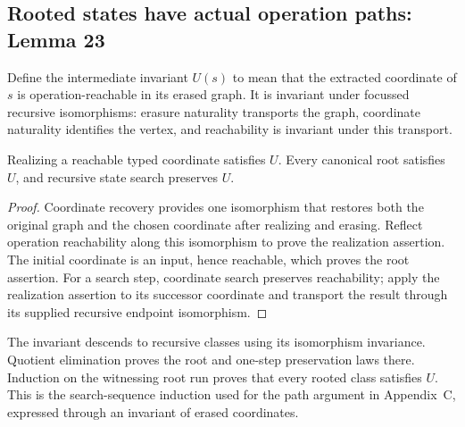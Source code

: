 \subsection{Rooted states have actual operation paths: Lemma 23}
\label{sec:rooted-operation-path}
Define the intermediate invariant $U(s)$ to mean that the extracted coordinate
of $s$ is operation-reachable in its erased graph. It is invariant under
focussed recursive isomorphisms: erasure naturality transports the graph,
coordinate naturality identifies the vertex, and reachability is invariant
under this transport.

\begin{lemma}
Realizing a reachable typed coordinate satisfies $U$. Every canonical root
satisfies $U$, and recursive state search preserves $U$.
\end{lemma}
\begin{proof}
Coordinate recovery provides one isomorphism that restores both the original
graph and the chosen coordinate after realizing and erasing. Reflect operation
reachability along this isomorphism to prove the realization assertion.
The initial coordinate is an input, hence reachable, which proves the root
assertion. For a search step, coordinate search preserves reachability; apply
the realization assertion to its successor coordinate and transport the
result through its supplied recursive endpoint isomorphism.
\end{proof}

The invariant descends to recursive classes using its isomorphism invariance.
Quotient elimination proves the root and one-step preservation laws there.
Induction on the witnessing root run proves that every rooted class satisfies
$U$. This is the search-sequence induction used for the path argument in
Appendix~C, expressed through an invariant of erased coordinates.


